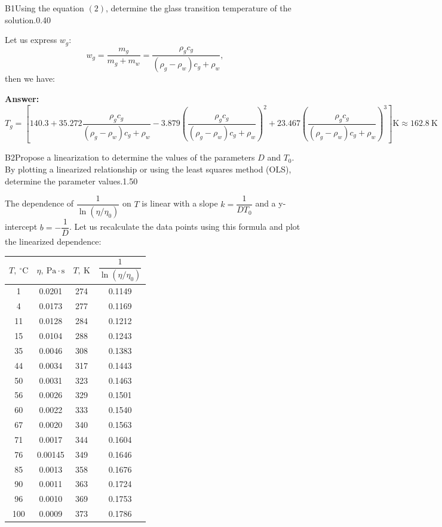 \documentclass[11pt,a4paper]{article}
\begin{document}
\begin{solcard}{B1}{Using the equation $(2)$, determine the glass transition temperature of the solution.}{0.40}

Let us express $w_g$: \[w_g=\dfrac{m_g}{m_g+m_w}=\dfrac{\rho_gc_g}{(\rho_g-\rho_w)c_g+\rho_w},\] then we have:

\par\smallskip\noindent\textbf{Answer:} 
\[ T_g = \left[ 140.3 + 35.272\dfrac{\rho_gc_g}{(\rho_g-\rho_w)c_g+\rho_w} - 3.879\left(\dfrac{\rho_gc_g}{(\rho_g-\rho_w)c_g+\rho_w}\right)^2 + 23.467\left(\dfrac{\rho_gc_g}{(\rho_g-\rho_w)c_g+\rho_w}\right)^3 \right] \mathrm{K} \approx 162.8~\mathrm{K} \]
\end{solcard}

\begin{solcard}{B2}{Propose a linearization to determine the values of the parameters $D$ and $T_0$. By plotting a linearized relationship or using the least squares method (OLS), determine the parameter values.}{1.50}

The dependence of $\dfrac{1}{\ln(\eta/\eta_0)}$ on $T$ is linear with a slope $k=\dfrac{1}{DT_0}$ and a y-intercept $b=-\dfrac{1}{D}$. Let us recalculate the data points using this formula and plot the linearized dependence:

\begin{table}[H]
\centering
\begin{tabular}{|c|c|c|c|}
\hline
$T,~^\circ \mathrm{C}$ & $\eta,~\mathrm{Pa}\cdot\mathrm{s}$ & $T,~\mathrm{K}$ & $\dfrac{1}{\ln(\eta/\eta_0)}$ \\
\hline
1 & 0.0201 & 274 & 0.1149 \\
4 & 0.0173 & 277 & 0.1169 \\
11 & 0.0128 & 284 & 0.1212 \\
15 & 0.0104 & 288 & 0.1243 \\
35 & 0.0046 & 308 & 0.1383 \\
44 & 0.0034 & 317 & 0.1443 \\
50 & 0.0031 & 323 & 0.1463 \\
56 & 0.0026 & 329 & 0.1501 \\
60 & 0.0022 & 333 & 0.1540 \\
67 & 0.0020 & 340 & 0.1563 \\
71 & 0.0017 & 344 & 0.1604 \\
76 & 0.00145 & 349 & 0.1646 \\
85 & 0.0013 & 358 & 0.1676 \\
90 & 0.0011 & 363 & 0.1724 \\
96 & 0.0010 & 369 & 0.1753 \\
100 & 0.0009 & 373 & 0.1786 \\
\hline
\end{tabular}
\end{table}


\end{solcard}
\end{document}
